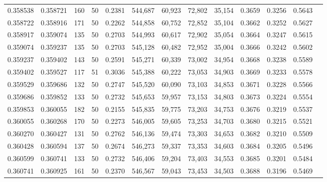 \begin{tabular}{rrrrrrrrrrrrr}
0.358538 & 0.358721 &   160 &  50 &                                     0.2381 & 544,687 &  60,923 &  72,802 &  35,154 & 0.3659 & 0.3256 & 0.5643 \\
0.358722 & 0.358916 &   171 &  50 &                                     0.2262 & 544,858 &  60,752 &  72,852 &  35,104 & 0.3662 & 0.3252 & 0.5627 \\
0.358917 & 0.359074 &   135 &  50 &                                     0.2703 & 544,993 &  60,617 &  72,902 &  35,054 & 0.3664 & 0.3247 & 0.5615 \\
0.359074 & 0.359237 &   135 &  50 &                                     0.2703 & 545,128 &  60,482 &  72,952 &  35,004 & 0.3666 & 0.3242 & 0.5602 \\
0.359237 & 0.359402 &   143 &  50 &                                     0.2591 & 545,271 &  60,339 &  73,002 &  34,954 & 0.3668 & 0.3238 & 0.5589 \\
0.359402 & 0.359527 &   117 &  51 &                                     0.3036 & 545,388 &  60,222 &  73,053 &  34,903 & 0.3669 & 0.3233 & 0.5578 \\
0.359529 & 0.359686 &   132 &  50 &                                     0.2747 & 545,520 &  60,090 &  73,103 &  34,853 & 0.3671 & 0.3228 & 0.5566 \\
0.359686 & 0.359852 &   133 &  50 &                                     0.2732 & 545,653 &  59,957 &  73,153 &  34,803 & 0.3673 & 0.3224 & 0.5554 \\
0.359853 & 0.360055 &   182 &  50 &                                     0.2155 & 545,835 &  59,775 &  73,203 &  34,753 & 0.3676 & 0.3219 & 0.5537 \\
0.360055 & 0.360268 &   170 &  50 &                                     0.2273 & 546,005 &  59,605 &  73,253 &  34,703 & 0.3680 & 0.3215 & 0.5521 \\
0.360270 & 0.360427 &   131 &  50 &                                     0.2762 & 546,136 &  59,474 &  73,303 &  34,653 & 0.3682 & 0.3210 & 0.5509 \\
0.360428 & 0.360594 &   137 &  50 &                                     0.2674 & 546,273 &  59,337 &  73,353 &  34,603 & 0.3684 & 0.3205 & 0.5496 \\
0.360599 & 0.360741 &   133 &  50 &                                     0.2732 & 546,406 &  59,204 &  73,403 &  34,553 & 0.3685 & 0.3201 & 0.5484 \\
0.360741 & 0.360925 &   161 &  50 &                                     0.2370 & 546,567 &  59,043 &  73,453 &  34,503 & 0.3688 & 0.3196 & 0.5469 \\

\end{tabular}
